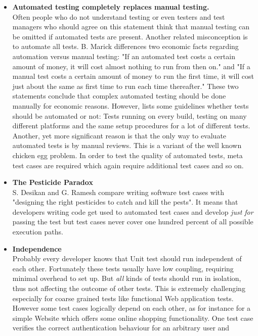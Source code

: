 \documentclass[12pt, notitlepage]{article}
\begin{document}
\begin{itemize}
	\item \textbf{Automated testing completely replaces manual testing.}\\
	Often people who do not understand testing or even testers and test managers who should agree on this statement think that manual testing can be omitted if automated tests are present. Another related misconception 
	is to automate all tests. B. Marick\cite{testing-mistakes} differences two economic facts regarding automation versus manual testing:
	"If an automated test costs a certain amount of money, it will cost almost nothing to run from then on." and
	"If a manual test costs a certain amount of money to run the first time, it will cost just about the same as first time to run each time thereafter."
	These two statements conclude that complex automated testing should be done manually for economic reasons.
	However, \cite{test-automation-success} lists some guidelines whether tests should be automated or not: Tests running on every build,
	testing on many different platforms and the same setup procedures for a lot of different tests. \\
	Another, yet more significant reason is that the only way to evaluate automated tests is by manual reviews. This is a variant of the well known
	chicken egg problem. In order to test the quality of automated tests, meta test cases are required which again require additional test cases and so on.
	\item \textbf{The Pesticide Paradox}\\
	S. Desikan and G. Ramesh\cite{softare-testing-principles} compare writing software test cases with "designing the right pesticides to catch and kill the pests".
	It means that developers writing code get used to automated test cases and develop \textit{just for} passing the test but test cases never cover one hundred 
	percent of all possible execution paths. 
	\item \textbf{Independence}\\
	Probably every developer knows that Unit test should run independent of each other. Fortunately these tests usually have low coupling, requiring minimal
	overhead to set up. But \textit{all} kinds of tests should run in isolation, thus not affecting the outcome of other tests.
	This is extremely challenging especially for coarse grained tests like functional Web application tests. However some test cases logically depend on each other, as for instance for a simple Website which offers some online shopping functionality. One test case verifies the correct authentication behaviour for an arbitrary user and

\end{itemize}
\end{document}
